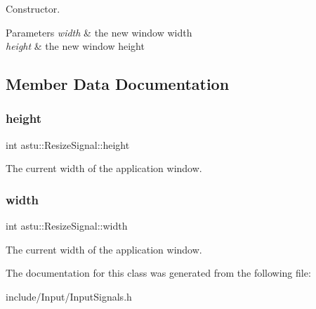 Constructor.


\begin{DoxyParams}{Parameters}
{\em width} & the new window width \\
\hline
{\em height} & the new window height \\
\hline
\end{DoxyParams}


\subsection{Member Data Documentation}
\mbox{\label{classastu_1_1ResizeSignal_aa61f62da490dd5fb196536dabb70640c}} 
\subsubsection{\texorpdfstring{height}{height}}
{\footnotesize\ttfamily int astu\+::\+Resize\+Signal\+::height}

The current width of the application window. \mbox{\label{classastu_1_1ResizeSignal_a028489521e952316f52b19f0bf4ebf0b}} 
\subsubsection{\texorpdfstring{width}{width}}
{\footnotesize\ttfamily int astu\+::\+Resize\+Signal\+::width}

The current width of the application window. 

The documentation for this class was generated from the following file\+:\begin{DoxyCompactItemize}
\item 
include/\+Input/Input\+Signals.\+h\end{DoxyCompactItemize}
